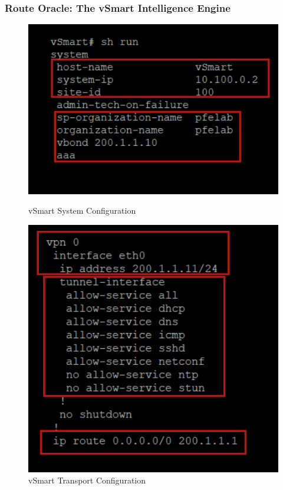 \documentclass[12pt,english]{report}
\begin{document}
\subsubsection{Route Oracle: The vSmart Intelligence Engine}

\begin{figure}[H]
    \begin{minipage}[b]{0.48\textwidth} %
        \centering
        \includegraphics[width=\textwidth]{chapitre 3/21.png}
        \caption{vSmart System Configuration}
        \label{fig:vSmart System Configuration}
    \end{minipage}
    \hfill %
    \begin{minipage}[b]{0.48\textwidth} %
        \centering
        \includegraphics[width=\textwidth]{chapitre 3/22.png}
        \caption{vSmart Transport Configuration}
        \label{fig:vSmart Transport Configuration}
    \end{minipage}
\end{figure}
\end{document}
